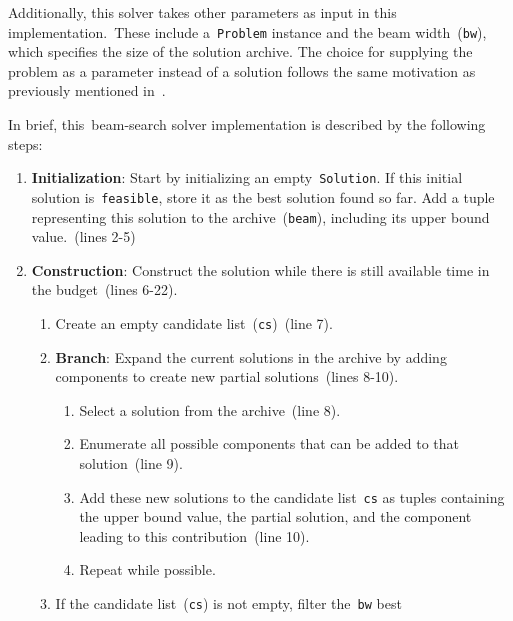 Additionally, this solver takes other parameters as input in this
implementation.~These include a~\texttt{Problem} instance and the beam
width~(\texttt{bw}), which specifies the size of the solution archive. The
choice for supplying the problem as a parameter instead of a solution follows
the same motivation as previously mentioned in~.



In brief, this~\acrshort{beam-search} solver implementation is described by the
following steps:

\begin{enumerate}
      \item \textbf{Initialization}: Start by initializing an empty~\texttt{Solution}. If
            this initial solution is~\texttt{feasible}, store it as the best solution found so far.
            Add a tuple representing this solution to the archive~(\texttt{beam}), including its
            upper bound value.~(lines 2-5)
      \item \textbf{Construction}: Construct the solution while there is still available time in the budget~(lines 6-22).
            \begin{enumerate}
                  \item Create an empty candidate list~(\texttt{cs})~(line 7).
                  \item \textbf{Branch}: Expand the current solutions in the archive by adding
                        components to create new partial solutions~(lines 8-10).
                        \begin{enumerate}
                              \item Select a solution from the archive~(line 8).
                              \item Enumerate all possible components that can be added to that solution~(line 9).
                              \item Add these new solutions to the candidate list~\texttt{cs} as tuples containing
                                    the upper bound value, the partial solution, and the component leading to
                                    this contribution~(line 10).
                              \item Repeat while possible.
                        \end{enumerate}
                  \item If the candidate list~(\texttt{cs}) is not empty, filter the~\texttt{bw} best

\end{enumerate}
\end{enumerate}

